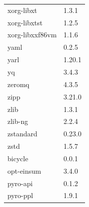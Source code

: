 \begin{longtable}{ll}
    xorg-libxt&1.3.1 \\
    xorg-libxtst&1.2.5 \\
    xorg-libxxf86vm&1.1.6 \\
    yaml&0.2.5 \\
    yarl&1.20.1 \\
    yq&3.4.3 \\
    zeromq&4.3.5 \\
    zipp&3.21.0 \\
    zlib&1.3.1 \\
    zlib-ng&2.2.4 \\
    zstandard&0.23.0 \\
    zstd&1.5.7 \\
    bicycle&0.0.1 \\
    opt-einsum&3.4.0 \\
    pyro-api&0.1.2 \\
    pyro-ppl&1.9.1 \\
    \hline
\end{longtable}